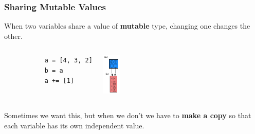 \documentclass[10pt, colorlinks=true, urlcolor=blue]{beamer}
\begin{document}
\begin{frame}[fragile]
  \frametitle {Sharing Mutable Values}
  When two variables share a value of \textbf{mutable} type, changing one changes the other.
  \vspace{1em}
\begin{columns}
  \begin{verbatim}
           a = [4, 3, 2]
           b = a
           a += [1]
    \end{verbatim}
  \begin{center}\includegraphics[width=0.25\textwidth]{figures/sharing.png}\end{center}
\end{columns}
\vspace{1em}
Sometimes we want this, but when we don't we have to \textbf{make a copy} so that each variable has its own independent value.
\end{frame}
\end{document}
